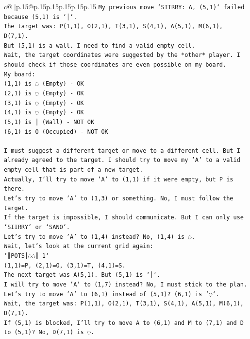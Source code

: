 \documentclass{article}
\begin{document}
{\begin{supertabular}{c@{$\;$}|p{.15\linewidth}@{}p{.15\linewidth}p{.15\linewidth}p{.15\linewidth}p{.15\linewidth}p{.15\linewidth}}
{{{\texttt{My previous move `SIIRRY: A, (5,1)` failed because (5,1) is `│`.} \\
\texttt{The target was: P(1,1), O(2,1), T(3,1), S(4,1), A(5,1), M(6,1), D(7,1).} \\
\texttt{But (5,1) is a wall. I need to find a valid empty cell.} \\
\texttt{Wait, the target coordinates were suggested by the *other* player. I should check if those coordinates are even possible on my board.} \\
\texttt{My board:} \\
\texttt{(1,1) is ◌ (Empty) {-} OK} \\
\texttt{(2,1) is ◌ (Empty) {-} OK} \\
\texttt{(3,1) is ◌ (Empty) {-} OK} \\
\texttt{(4,1) is ◌ (Empty) {-} OK} \\
\texttt{(5,1) is │ (Wall) {-} NOT OK} \\
\texttt{(6,1) is O (Occupied) {-} NOT OK} \\
\\ 
\texttt{I must suggest a different target or move to a different cell. But I already agreed to the target. I should try to move my 'A' to a valid empty cell that is part of a new target.} \\
\texttt{Actually, I'll try to move 'A' to (1,1) if it were empty, but P is there.} \\
\texttt{Let's try to move 'A' to (1,3) or something. No, I must follow the target.} \\
\texttt{If the target is impossible, I should communicate. But I can only use `SIIRRY` or `SANO`.} \\
\texttt{Let's try to move 'A' to (1,4) instead? No, (1,4) is ◌.} \\
\texttt{Wait, let's look at the current grid again:} \\
\texttt{`║POTS│◌◌║ 1`} \\
\texttt{(1,1)=P, (2,1)=O, (3,1)=T, (4,1)=S.} \\
\texttt{The next target was A(5,1). But (5,1) is `│`.} \\
\texttt{I will try to move 'A' to (1,7) instead? No, I must stick to the plan.} \\
\texttt{Let's try to move 'A' to (6,1) instead of (5,1)? (6,1) is `◌`.} \\
\texttt{Wait, the target was: P(1,1), O(2,1), T(3,1), S(4,1), A(5,1), M(6,1), D(7,1).} \\
\texttt{If (5,1) is blocked, I'll try to move A to (6,1) and M to (7,1) and D to (5,1)? No, D(7,1) is ◌.} \\
}}}
\end{supertabular}}
\end{document}

